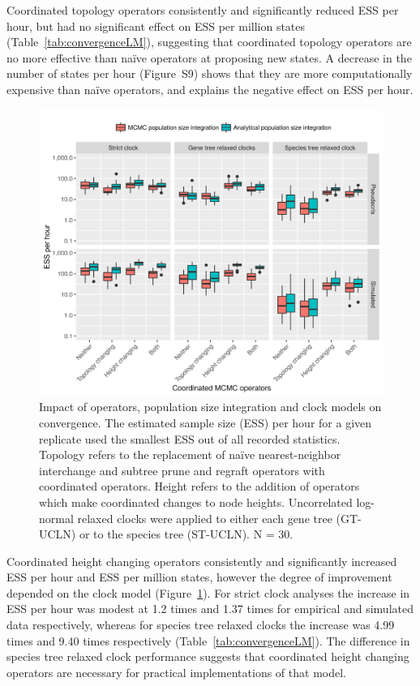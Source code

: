 \documentclass[12pt]{article}
\begin{document}
Coordinated topology operators consistently and significantly reduced ESS
per hour, but had no significant effect on ESS per million states
(Table~\ref{tab:convergenceLM}), suggesting that coordinated topology
operators are no more effective than na\"ive operators at proposing new
states. A decrease in the number of states per hour (Figure~S9) shows that
they are more computationally expensive than na\"ive operators, and explains
the negative effect on ESS per hour.

\begin{figure}[htb!]
\centering
\includegraphics[width=\textwidth]{minimum_ess_per_hour_starbeast2.png}
\caption
{Impact of operators, population size integration and clock models on
convergence. The estimated sample size (ESS) per hour for a given replicate
used the smallest ESS out of all recorded statistics. Topology refers to the
replacement of na\"ive nearest-neighbor interchange and subtree prune and
regraft operators with coordinated operators. Height refers to the addition of
operators which make coordinated changes to node heights. Uncorrelated log-normal relaxed clocks were applied to either each gene tree (GT-UCLN) or to
the species tree (ST-UCLN). N = 30.}
\label{fig:realEssPerHour}
\end{figure}

Coordinated height changing operators consistently and significantly
increased ESS per hour and ESS per million states, however the degree of
improvement depended on the clock model (Figure~\ref{fig:realEssPerHour}). For
strict clock analyses the increase in ESS per hour was modest at 1.2 times and
1.37 times for empirical and simulated data respectively, whereas for species
tree relaxed clocks the increase was 4.99 times and 9.40 times respectively
(Table~\ref{tab:convergenceLM}). The difference in species tree relaxed clock
performance suggests that coordinated height changing operators are necessary
for practical implementations of that model.
\end{document}
